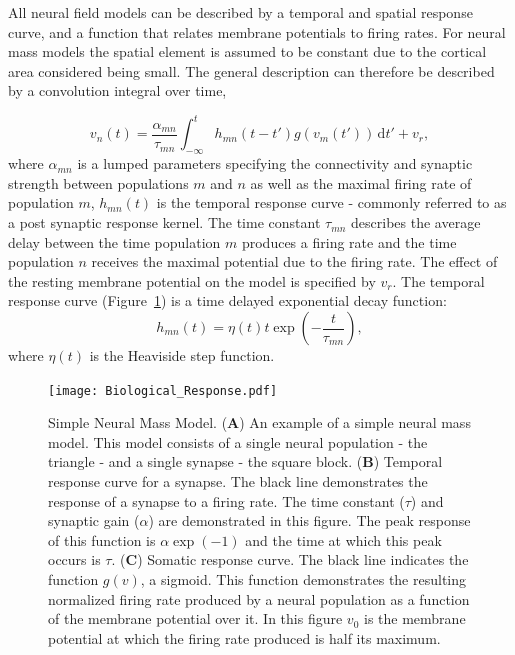 All neural field models can be described by a temporal and spatial response curve, and a function that relates membrane potentials to firing rates. For neural mass models the spatial element is assumed to be constant due to the cortical area considered being small. The general description can therefore be described by a convolution integral over time,

\begin{equation}\label{eq:conv_eq}
    v_n(t) = \frac{\alpha_{mn}}{\tau_{mn}}\int_{-\infty}^t  h_{mn}(t-t')g(v_m(t')) \,\mathrm{d}t' + v_r,
\end{equation}
where $\alpha_{mn}$ is a lumped parameters specifying the connectivity and synaptic strength between populations $m$ and $n$ as well as the maximal firing rate of population $m$, $h_{mn}(t)$ is the temporal response curve - commonly referred to as a post synaptic response kernel. The time constant $\tau_{mn}$  describes the average delay between the time population $m$ produces a firing rate and the time population $n$ receives the maximal potential due to the firing rate. The effect of the resting membrane potential on the model is specified by $v_r$. The temporal response curve (Figure~\ref{fig: Simple}) is a time delayed exponential decay function:
\begin{equation}
    h_{mn}(t) = \eta(t)t\exp\left(-\frac{t}{\tau_{mn}}\right),
\end{equation}
where $\eta(t)$ is the Heaviside step function. 

\begin{figure}
	\centering
		\texttt{[image: Biological\_Response.pdf]}
	\caption{Simple Neural Mass Model. (\textbf{A}) An example of a simple neural mass model. This model consists of a single neural population - the triangle - and a single synapse - the square block. (\textbf{B}) Temporal response curve for a synapse. The black line demonstrates the response of a synapse to a firing rate. The time constant ($\tau$) and synaptic gain ($\alpha$) are demonstrated in this figure. The peak response of this function is $\alpha \exp(-1)$ and the time at which this peak occurs is $\tau$. (\textbf{C}) Somatic response curve. The black line indicates the function $g(v)$, a sigmoid. This function demonstrates the resulting normalized firing rate produced by a neural population as a function of the membrane potential over it. In this figure $v_{0}$ is the membrane potential at which the firing rate produced is half its maximum.}
	\label{fig: Simple}
\end{figure}

